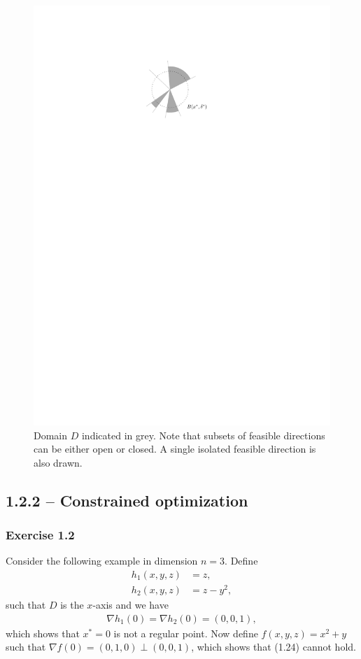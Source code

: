 \documentclass[a4paper]{article}
\begin{document}
\begin{figure}[b]
  \centering
  \includegraphics[]{figures/notes/locally-star-shaped}
  \caption{Domain $D$ indicated in grey. Note that subsets of feasible
    directions can be either open or closed. A single isolated feasible
    direction is also drawn.}
  \label{fig:star-shaped-domain}
\end{figure}


\subsection*{1.2.2 -- Constrained optimization}

\subsubsection*{Exercise 1.2}

Consider the following example in dimension $n=3$. Define
\begin{align*}
  h_{1}(x, y, z) &= z , \\
  h_{2}(x, y, z) &= z - y^{2} ,
\end{align*}
such that $D$ is the $x$-axis and we have
\begin{align*}
  \nabla h_{1}(0) = \nabla h_{2}(0) = (0, 0, 1) ,
\end{align*}
which shows that $x^{*} = 0$ is not a regular point. Now define
$f(x,y,z) = x^{2} + y$ such that $\nabla f(0) = (0, 1, 0) \perp (0, 0, 1)$,
which shows that (1.24) cannot hold.
\end{document}
